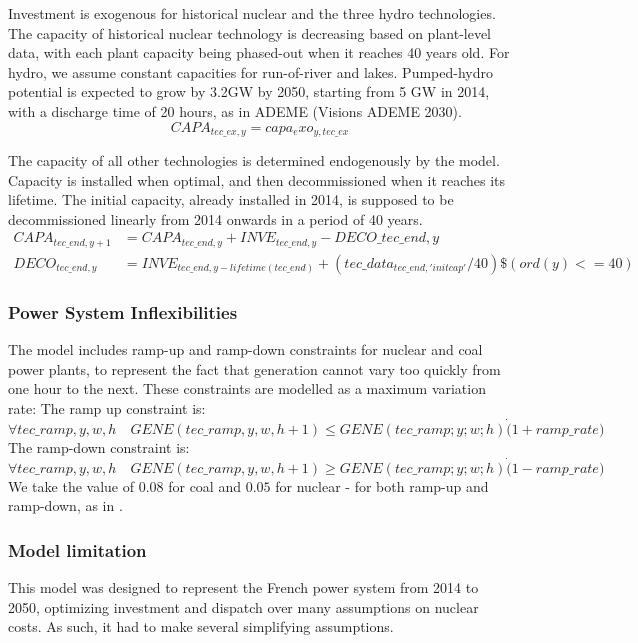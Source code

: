 Investment is exogenous for historical nuclear and the three hydro technologies. The capacity of historical nuclear technology is decreasing based on plant-level data, with each plant capacity being phased-out when it reaches 40 years old. For hydro, we assume constant capacities for run-of-river and lakes. Pumped-hydro potential is expected to grow by 3.2GW by 2050, starting from 5 GW in 2014, with a discharge time of 20 hours, as in ADEME (Visions ADEME 2030).
$$CAPA_{tec\_ex,y} = capa_exo_{y,tec\_ex} $$

The capacity of all other technologies is determined endogenously by the model. Capacity is installed when optimal, and then decommissioned when it reaches its lifetime. The initial capacity, already installed in 2014, is supposed to be decommissioned linearly from 2014 onwards in a period of 40 years.
\begin{align*}
CAPA_{tec\_end,y+1} &= CAPA_{tec\_end,y} + INVE_{tec\_end,y} - DECO\_{tec\_end,y} \\
DECO_{tec\_end,y}  &= INVE_{tec\_end,y-lifetime(tec\_end)} + (tec\_data_{tec\_end,'initcap'}/40)\$(ord(y) <= 40) 
\end{align*}



\subsubsection{Power System Inflexibilities}

The model includes ramp-up and ramp-down constraints for nuclear and coal power plants, to represent the fact that generation cannot vary too quickly from one hour to the next. These constraints are modelled as a maximum variation rate:
The ramp up constraint is:
$$\forall tec\_ramp,y,w,h \quad GENE(tec\_ramp,y,w,h+1) \leq GENE(tec\_ramp;y;w;h) \dot (1+ramp\_rate)$$
The ramp-down constraint is:
$$\forall tec\_ramp,y,w,h \quad GENE(tec\_ramp,y,w,h+1) \geq GENE(tec\_ramp;y;w;h) \dot (1-ramp\_rate)$$
We take the value of $0.08$ for coal and $0.05$ for nuclear - for both ramp-up and ramp-down, as in \citet{ADEME2015}.

\subsubsection{Model limitation}

This model was designed to represent the French power system from 2014 to 2050, optimizing investment and dispatch over many assumptions on nuclear costs. As such, it had to make several simplifying assumptions.

